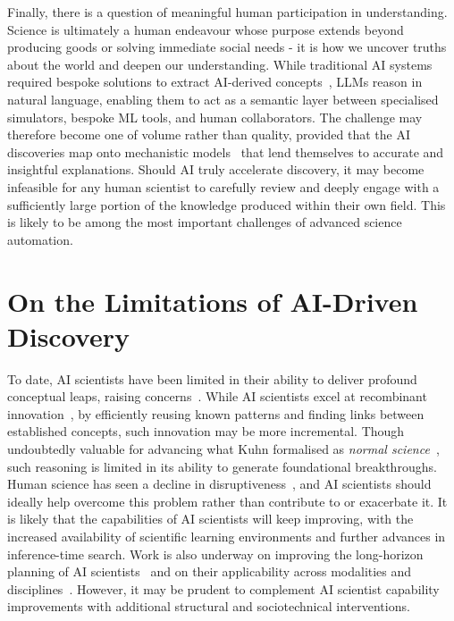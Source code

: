 \documentclass[11pt, a4paper, twocolumn, goog]{google}
\begin{document}
Finally, there is a question of meaningful human participation in understanding. Science is ultimately a human endeavour whose purpose extends beyond producing goods or solving immediate social needs - it is how we uncover truths about the world and deepen our understanding. While traditional AI systems required bespoke solutions to extract AI-derived concepts~\citep{schut2023bridginghumanaiknowledgegap}, LLMs reason in natural language, enabling them to act as a semantic layer between specialised simulators, bespoke ML tools, and human collaborators. The challenge may therefore become one of volume rather than quality, provided that the AI discoveries map onto mechanistic models~\citep{posner2026observationinsightmechanisticworld} that lend themselves to accurate and insightful explanations. Should AI truly accelerate discovery, it may become infeasible for any human scientist to carefully review and deeply engage with a sufficiently large portion of the knowledge produced within their own field. This is likely to be among the most important challenges of advanced science automation.

\section{On the Limitations of AI-Driven Discovery}
\label{sec:epistemology}

To date, AI scientists have been limited in their ability to deliver profound conceptual leaps, raising concerns~\citep{zahavy2026position}. While AI scientists excel at recombinant innovation~\citep{fleming2001recombinant, weitzman1998recombinant}, by efficiently reusing known patterns and finding links between established concepts, such innovation may be more incremental. Though undoubtedly valuable for advancing what Kuhn formalised as \emph{normal science}~\citep{kuhn1970structure}, such reasoning is limited in its ability to generate foundational breakthroughs. Human science has seen a decline in disruptiveness~\citep{park2023papers}, and AI scientists should ideally help overcome this problem rather than contribute to or exacerbate it. It is likely that the capabilities of AI scientists will keep improving, with the increased availability of scientific learning environments and further advances in inference-time search. Work is also underway on improving the long-horizon planning of AI scientists~\citep{zhao2026scienceflowlonghorizonagentml} and on their applicability across modalities and disciplines~\citep{li2026omniscientist}. However, it may be prudent to complement AI scientist capability improvements with additional structural and sociotechnical interventions.
\end{document}
